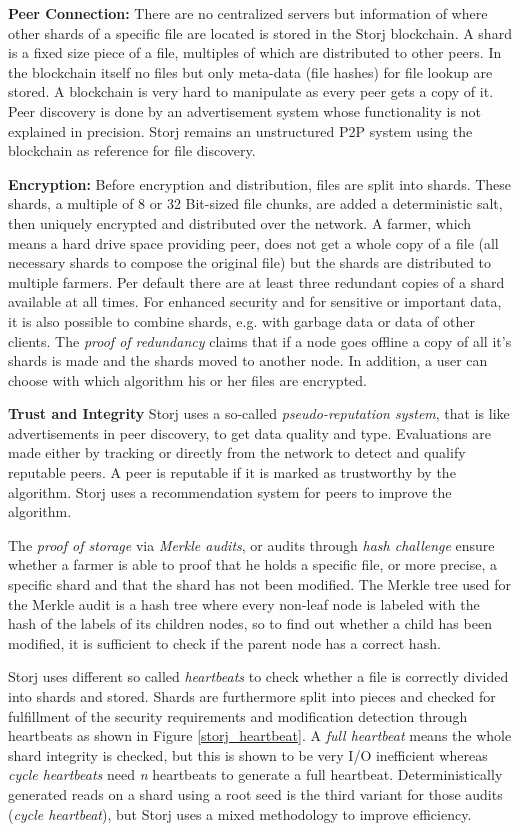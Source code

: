 \textbf{Peer Connection:} There are no centralized servers but information of where other shards of a specific file are located is stored in the Storj blockchain. A shard is a fixed size piece of a file, multiples of which are distributed to other peers. In the blockchain itself no files but only meta-data (file hashes) for file lookup are stored. A blockchain is very hard to manipulate as every peer gets a copy of it. Peer discovery is done by an advertisement system whose functionality is not explained in precision. Storj remains an unstructured P2P system using the blockchain as reference for file discovery.

\textbf{Encryption:} Before encryption and distribution, files are split into shards. These shards, a multiple of 8 or 32 Bit-sized file chunks, are added a deterministic salt, then uniquely encrypted and distributed over the network. A farmer, which means a hard drive space providing peer, does not get a whole copy of a file (all necessary shards to compose the original file) but the shards are distributed to multiple farmers. Per default there are at least three redundant copies of a shard available at all times. For enhanced security and for sensitive or important data, it is also possible to combine shards, e.g. with garbage data or data of other clients. The \textit{proof of redundancy} claims that if a node goes offline a copy of all it's shards is made and the shards moved to another node. In addition, a user can choose with which algorithm his or her files are encrypted.

\textbf{Trust and Integrity} Storj uses a so-called \textit{pseudo-reputation system}, that is like advertisements in peer discovery, to get data quality and type. Evaluations are made either by tracking or directly from the network to detect and qualify reputable peers. A peer is reputable if it is marked as trustworthy by the algorithm. Storj uses a recommendation system for peers to improve the algorithm.

The \textit{proof of storage} via \textit{Merkle audits}, or audits through \textit{hash challenge} ensure whether a farmer is able to proof that he holds a specific file, or more precise, a specific shard and that the shard has not been modified. The Merkle tree used for the Merkle audit is a hash tree where every non-leaf node is labeled with the hash of the labels of its children nodes, so to find out whether a child has been modified, it is sufficient to check if the parent node has a correct hash.

Storj uses different so called \textit{heartbeats} to check whether a file is correctly divided into shards and stored. Shards are furthermore split into pieces and checked for fulfillment of the security requirements and modification detection through heartbeats as shown in Figure \ref{storj_heartbeat}. A \textit{full heartbeat} means the whole shard integrity is checked, but this is shown to be very I/O inefficient whereas \textit{cycle heartbeats} need \textsl{n} heartbeats to generate a full heartbeat. Deterministically generated reads on a shard using a root seed is the third variant for those audits (\textit{cycle heartbeat}), but Storj uses a mixed methodology to improve efficiency.

